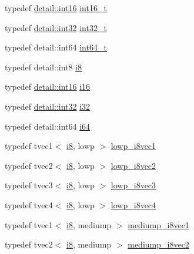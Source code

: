 \begin{DoxyCompactItemize}
\item 
typedef \hyperlink{stb__image_8c_a259fa4834387bd68627ddf37bb3ebdb9}{detail\+::int16} \hyperlink{group__gtc__type__precision_gaf89ee61e0d34aa4a462104b7ae7f2da6}{int16\+\_\+t}
\item 
typedef \hyperlink{stb__image_8c_a43d43196463bde49cb067f5c20ab8481}{detail\+::int32} \hyperlink{group__gtc__type__precision_gab870c0eb6f525b0c8c4716762e0fc3a8}{int32\+\_\+t}
\item 
typedef detail\+::int64 \hyperlink{group__gtc__type__precision_ga6abb23fbf4e39c50ec5341160b5da5ab}{int64\+\_\+t}
\item 
typedef detail\+::int8 \hyperlink{group__gtc__type__precision_gaae064be68b7d36cd7910c16e8ad18bba}{i8}
\item 
typedef \hyperlink{stb__image_8c_a259fa4834387bd68627ddf37bb3ebdb9}{detail\+::int16} \hyperlink{group__gtc__type__precision_ga35e5542ca05b29cc256fdafb8503d1fd}{i16}
\item 
typedef \hyperlink{stb__image_8c_a43d43196463bde49cb067f5c20ab8481}{detail\+::int32} \hyperlink{group__gtc__type__precision_ga1d8ed5c43e91ea7d4528389da4fa9524}{i32}
\item 
typedef detail\+::int64 \hyperlink{group__gtc__type__precision_gac7a7eaad46064fc952b06df33689da23}{i64}
\item 
typedef tvec1$<$ \hyperlink{group__gtc__type__precision_gaae064be68b7d36cd7910c16e8ad18bba}{i8}, lowp $>$ \hyperlink{namespaceglm_abfcc3b2b920eb25e00739cd5d0baa379}{lowp\+\_\+i8vec1}
\item 
typedef tvec2$<$ \hyperlink{group__gtc__type__precision_gaae064be68b7d36cd7910c16e8ad18bba}{i8}, lowp $>$ \hyperlink{namespaceglm_a51fdc711ec0659398abfa207771dfce9}{lowp\+\_\+i8vec2}
\item 
typedef tvec3$<$ \hyperlink{group__gtc__type__precision_gaae064be68b7d36cd7910c16e8ad18bba}{i8}, lowp $>$ \hyperlink{namespaceglm_a231e6d925ce478b7effba2f622681437}{lowp\+\_\+i8vec3}
\item 
typedef tvec4$<$ \hyperlink{group__gtc__type__precision_gaae064be68b7d36cd7910c16e8ad18bba}{i8}, lowp $>$ \hyperlink{namespaceglm_a3b9d9557da79f64eca64c8dcc15987ff}{lowp\+\_\+i8vec4}
\item 
typedef tvec1$<$ \hyperlink{group__gtc__type__precision_gaae064be68b7d36cd7910c16e8ad18bba}{i8}, mediump $>$ \hyperlink{namespaceglm_aa849ad5e796d74e0fb09cb62e7ef8d86}{mediump\+\_\+i8vec1}
\item 
typedef tvec2$<$ \hyperlink{group__gtc__type__precision_gaae064be68b7d36cd7910c16e8ad18bba}{i8}, mediump $>$ \hyperlink{namespaceglm_afb2f4e62d3b4e1da13ef6d6c891647cb}{mediump\+\_\+i8vec2}

\end{DoxyCompactItemize}
